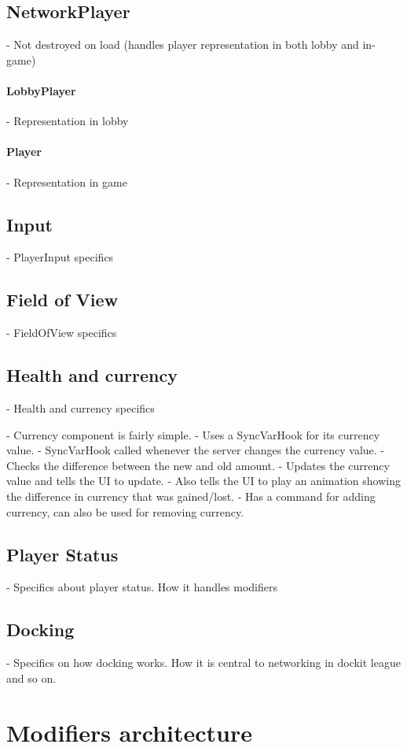 \subsection{NetworkPlayer}
    - Not destroyed on load (handles player representation in both lobby and in-game)
\paragraph{LobbyPlayer}
    - Representation in lobby
\paragraph{Player}
    - Representation in game
    
\subsection{Input}
    - PlayerInput specifics
\subsection{Field of View}
    - FieldOfView specifics
\subsection{Health and currency}
    - Health and currency specifics
    
    - Currency component is fairly simple. 
        - Uses a SyncVarHook for its currency value. 
            - SyncVarHook called whenever the server changes the currency value. 
            - Checks the difference between the new and old amount. 
            - Updates the currency value and tells the UI to update.
            - Also tells the UI to play an animation showing the difference in currency that was gained/lost.
        - Has a command for adding currency, can also be used for removing currency. 
\subsection{Player Status}
    - Specifics about player status. How it handles modifiers
\subsection{Docking}
    - Specifics on how docking works. How it is central to networking in dockit league and so on. 

\section{Modifiers architecture}
